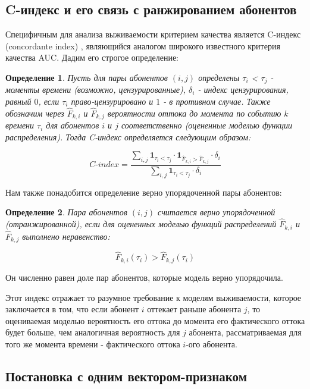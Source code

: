 \documentclass{article}
\newtheorem{definition}{Определение}
\begin{document}
\subsection{C-индекс и его связь с ранжированием абонентов}


Специфичным для анализа выживаемости критерием качества является C-индекс (concordante index) \cite{Alabdallah2022}, являющийся аналогом широкого известного критерия качества AUC. Дадим его строгое определение: 

\begin{definition}
Пусть для пары абонентов $(i,j)$ определены $\tau_i$  < $\tau_j$ - моменты времени (возможно, цензурированные), $\delta_i$ - индекс цензурирования, равный $0$, если $\tau_i$ право-цензурировано и $1$ - в противном случае. Также обозначим через $\hat{F}_{k,i}$ и $\hat{F}_{k,j}$ вероятности оттока до момента по событию $k$ времени $\tau_i$ для абонентов $i$ и $j$ соответственно (оцененные моделью функции распределения). Тогда C-индекс определяется следующим образом:

$$C\text{-}index =
\frac{
	\sum\limits_{i,j} \mathbf{1}_{\tau_i < \tau_j} \cdot \mathbf{1}_{\hat{F}_{k,i} > \hat{F}_{k,j}} \cdot \delta_i
}{
	\sum\limits_{i,j} \mathbf{1}_{\tau_i < \tau_j} \cdot \delta_i
}$$	
\end{definition}

Нам также понадобится определение верно упорядоченной пары абонентов: 

\begin{definition}
Пара абонентов $(i,j)$ считается верно упорядоченной (отранжированной), если для оцененных моделью функций распределений $\hat{F}_{k,i}$ и $\hat{F}_{k,j}$ выполнено неравенство: 

$$ \hat{F}_{k,i}(\tau_i ) >  \hat{F}_{k,j}(\tau_i ) $$ 
\end{definition}





 Он численно равен доле пар абонентов, которые модель верно упорядочила. 

Этот индекс отражает то разумное требование к моделям выживаемости, которое заключается в том, что если абонент $i$ оттекает раньше абонента $j$, то оцениваемая моделью вероятность его оттока до момента его фактического оттока будет больше, чем аналогичная вероятность для $j$ абонента, рассматриваемая для того же момента времени - фактического оттока $i$-ого абонента. 

\subsection{Постановка с одним вектором-признаком}
\end{document}
